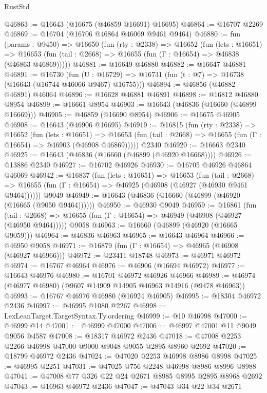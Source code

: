 \begin{lexlean}{RustStd}
\begin{coremodule}
@46863 := @16643 (@16675 (@46859 @16691) @16695)
@46864 := @16707 @2269
@46869 := @16704 (@16706 @46864 @46069 @9461 @9464)
@46880 := fun (params : @9450) =>
  @16650
    (fun (rty : @2338) =>
    @16652
      (fun (lets : @16651) =>
      @16653 (fun (tail : @2668) => @16655 (fun (Γ : @16654) => @46838 (@46863 @46869)))))
@46881 := @16649 @46880
@46882 := @16647 @46881
@46891 := @16730
    (fun (U : @16729) => @16731 (fun (t : @7) => @16738 (@16643 (@16744 @46066 @9467) @16755)))
@46894 := @46856 (@46882 @46891) @46064
@46896 := @16628 @46881 @46891
@46898 := @16812 @46880 @8954
@46899 := @16661 @8954
@46903 := @16643 (@46836 (@16660 (@46899 @16669)))
@46905 := @46859 (@16690 @8954)
@46906 := @16675 @46905
@46908 := @16643 (@46906 @16695)
@46919 := @16815
    (fun (rty : @2338) =>
    @16652
      (fun (lets : @16651) =>
      @16653 (fun (tail : @2668) => @16655 (fun (Γ : @16654) => @46903 (@46908 @46869)))))
    @2340
@46920 := @16663 @2340
@46925 := @16643 (@46836 (@16660 (@46899 (@46920 @16668))))
@46926 := @13886 @2340
@46927 := @16702 @46926
@46930 := @16705 @46926 @46864 @46069
@46942 := @16837
    (fun (lets : @16651) =>
    @16653
      (fun (tail : @2668) =>
      @16655 (fun (Γ : @16654) => @46925 (@46908 (@46927 (@46930 @9461 @9464))))))
    @9049
@46949 := @16643 (@46836 (@16660 (@46899 (@46920 (@16665 (@9050 @9464))))))
@46950 := @46930 @9049
@46959 := @16861
    (fun (tail : @2668) => @16655 (fun (Γ : @16654) => @46949 (@46908 (@46927 (@46950 @9464)))))
    @9058
@46963 := @16660 (@46899 (@46920 (@16665 @9059)))
@46964 := @46836 @46963
@46965 := @16643 @46964
@46966 := @46950 @9058
@46971 := @16879 (fun (Γ : @16654) => @46965 (@46908 (@46927 @46966)))
@46972 := @23411 @18748
@46973 := @46971 @46972
@46974 := @16767 @46964
@46976 := @46906 (@16694 @46972)
@46977 := @16643 @46976
@46980 := @16701 @46972 @46926 @46966
@46989 := @46974 (@46977 @46980) (@9607 @14909 @14905 @46963 @14916 (@9478 @46963))
@46993 := @16767 @46976 @46980 (@16924 @46905)
@46995 := @18304 @46972 @2436
@46997 := @46995 @1080 @2267
@46998 := LexLeanTarget.TargetSyntax.Ty.ordering
@46999 := @10 @46998
@47000 := @46999 @14
@47001 := @46999 @47000
@47006 := @46997 @47001 @11 @9049 @9056 @4587
@47008 := @18317 @46972 @2436
@47018 := @47008 @2253 @2266 @46998 @47000 @9000 @9048 @9055 @2895 @8960 @2692
@47020 := @18799 @46972 @2436
@47024 := @47020 @2253 @46998 @8986 @8998
@47025 := @46995 @2251
@47031 := @47025 @756 @2248 @46998 @8986 @8996 @8988
@47041 := @47008 @77 @326 @22 @24 @2671 @8985 @8995 @2895 @8968 @2692
@47043 := @16963 @46972 @2436
@47047 := @47043 @34 @22 @34 @2671

\end{coremodule}
\end{lexlean}
